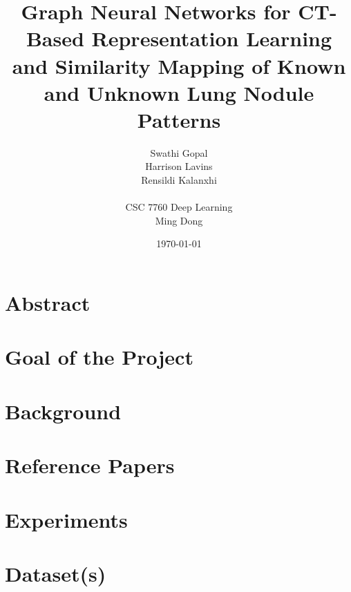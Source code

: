 \documentclass[11pt]{article}
\title{\textbf{Graph Neural Networks for CT-Based Representation Learning and Similarity Mapping of Known and Unknown Lung Nodule Patterns}}
\author{
Swathi Gopal \\
Harrison Lavins \\
Rensildi Kalanxhi \\
\\
CSC 7760 Deep Learning \\
Ming Dong
}
\date{\today}
\begin{document}
\maketitle

\section*{Abstract}


\section*{Goal of the Project}

\section*{Background}

\section*{Reference Papers}

\section*{Experiments}

\section*{Dataset(s)}
\end{document}
